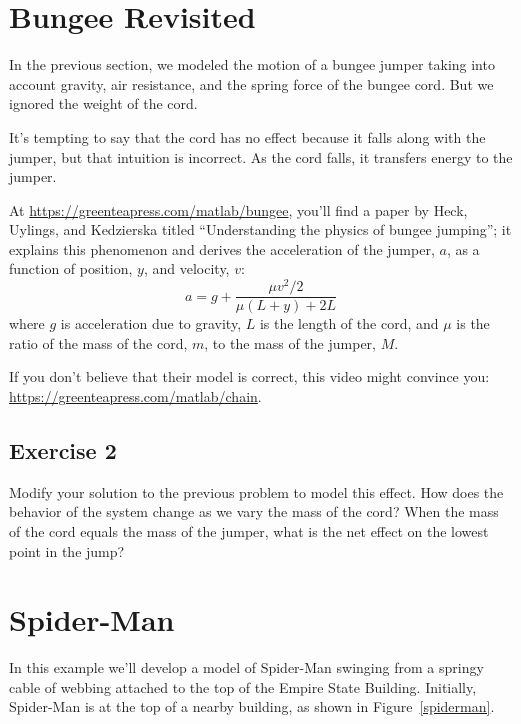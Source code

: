 \section{Bungee Revisited}


In the previous section, we modeled the motion of a bungee jumper taking into account gravity, air resistance, and the spring force of the bungee cord.  But we ignored the weight of the cord.


It's tempting to say that the cord has no effect because it falls along with the jumper, but that intuition is incorrect.  As the cord falls, it transfers energy to the jumper.


At \url{https://greenteapress.com/matlab/bungee}, you'll find a paper by Heck, Uylings, and Kedzierska titled ``Understanding the physics of bungee jumping''; it explains this phenomenon and derives the acceleration of the jumper, $a$, as a function of position, $y$, and velocity, $v$:
%
\[ a = g + \frac{\mu v^2/2}{\mu(L+y) + 2L} \]
%
where $g$ is acceleration due to gravity, $L$ is the length of the cord, and $\mu$ is the ratio of the mass of the cord, $m$, to the mass of the jumper, $M$.

If you don't believe that their model is correct, this video might convince you: \url{https://greenteapress.com/matlab/chain}.

\subsection{Exercise 2}

Modify your solution to the previous problem to model this effect.  How does the behavior of the system change as we vary the mass of the cord?  When the mass of the cord equals the mass of the jumper, what is the net effect on the lowest point in the jump?


\section{Spider-Man}

In this example we'll develop a model of Spider-Man swinging from a
springy cable of webbing attached to the top of the Empire State
Building.  Initially, Spider-Man is at the top of a nearby building, as
shown in \linebreak Figure~\ref{spiderman}.

